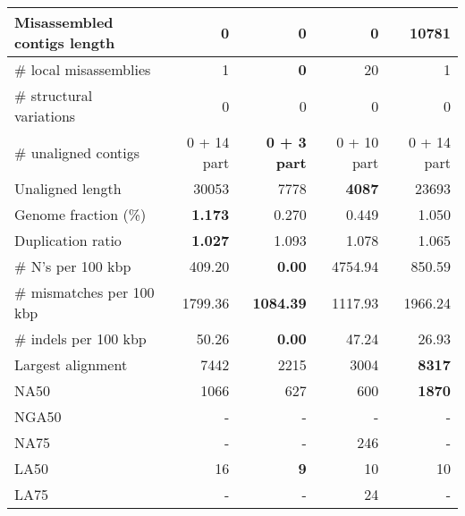 \documentclass[12pt,a4paper]{article}
\begin{document}
\begin{table}[ht]
\begin{center}
\begin{tabular}{|l*{4}{|r}|}
Misassembled contigs length & {\bf 0} & {\bf 0} & {\bf 0} & 10781 \\ \hline
\# local misassemblies & 1 & {\bf 0} & 20 & 1 \\ \hline
\# structural variations & 0 & 0 & 0 & 0 \\ \hline
\# unaligned contigs & 0 + 14 part & {\bf 0 + 3 part} & 0 + 10 part & 0 + 14 part \\ \hline
Unaligned length & 30053 & 7778 & {\bf 4087} & 23693 \\ \hline
Genome fraction (\%) & {\bf 1.173} & 0.270 & 0.449 & 1.050 \\ \hline
Duplication ratio & {\bf 1.027} & 1.093 & 1.078 & 1.065 \\ \hline
\# N's per 100 kbp & 409.20 & {\bf 0.00} & 4754.94 & 850.59 \\ \hline
\# mismatches per 100 kbp & 1799.36 & {\bf 1084.39} & 1117.93 & 1966.24 \\ \hline
\# indels per 100 kbp & 50.26 & {\bf 0.00} & 47.24 & 26.93 \\ \hline
Largest alignment & 7442 & 2215 & 3004 & {\bf 8317} \\ \hline
NA50 & 1066 & 627 & 600 & {\bf 1870} \\ \hline
NGA50 & - & - & - & - \\ \hline
NA75 & - & - & 246 & - \\ \hline
LA50 & 16 & {\bf 9} & 10 & 10 \\ \hline
LA75 & - & - & 24 & - \\ \hline
\end{tabular}
\end{center}
\end{table}
\end{document}
